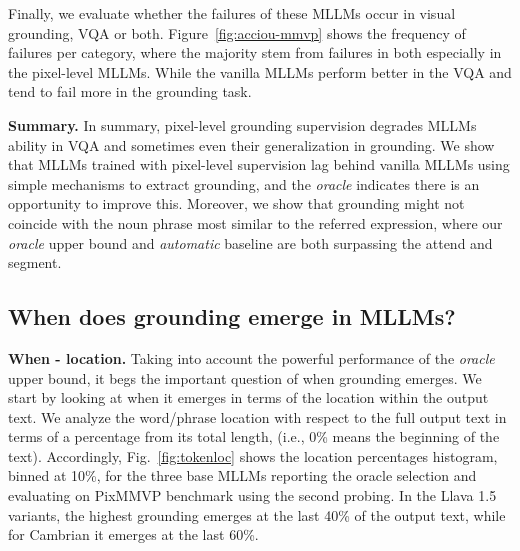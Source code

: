 Finally, we evaluate whether the failures of these MLLMs occur in visual grounding, VQA or both. Figure~\ref{fig:acciou-mmvp} shows the frequency of failures per category, where the majority stem from failures in both especially in the pixel-level MLLMs. While the vanilla MLLMs perform better in the VQA and tend to fail more in the grounding task.

\textbf{Summary.} In summary, pixel-level grounding supervision degrades MLLMs ability in VQA and sometimes even their generalization in grounding. We show that MLLMs trained with pixel-level supervision lag behind vanilla MLLMs using simple mechanisms to extract grounding, and the \textit{oracle} indicates there is an opportunity to improve this. Moreover, we show that grounding might not coincide with the noun phrase most similar to the referred expression, where our \textit{oracle} upper bound and \textit{automatic} baseline are both surpassing the attend and segment. %

\subsection{When does grounding emerge in MLLMs?}
\textbf{When - location.} Taking into account the powerful performance of the \textit{oracle} upper bound, it begs the important question of when grounding emerges. We start by looking at when it emerges in terms of the location within the output text. We analyze the word/phrase location with respect to the full output text in terms of a percentage from its total length, (i.e., 0\% means the beginning of the text). Accordingly, Fig.~\ref{fig:tokenloc} shows the location percentages histogram, binned at 10\%, for the three base MLLMs reporting the oracle selection and evaluating on PixMMVP benchmark using the second probing. In the Llava 1.5 variants, the highest grounding emerges at the last 40\% of the output text, while for Cambrian it emerges at the last 60\%. 

